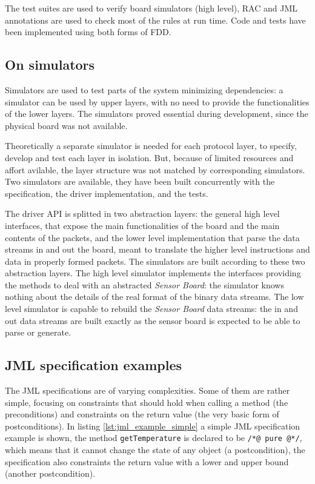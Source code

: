 \documentclass{article}
\newcommand{\lil}[1]{\texttt{\lstinline|#1|}}
\newcommand{\SB}{\emph{Sensor Board}\xspace}
\begin{document}
The test suites are used to verify board simulators (high level), RAC and JML annotations are used to check most of the rules at run time.
Code and tests have been implemented using both forms of FDD.



\subsection{On simulators}
\label{subsec:on_simulators}

Simulators are used to test parts of the system minimizing dependencies: a simulator can be used by upper layers, with no need to provide the functionalities of the lower layers. 
The simulators proved essential during development, since the physical board was not available.

Theoretically a separate simulator is needed for each protocol layer, to specify, develop and test each layer in isolation.  
But, because of limited resources and affort avilable, the layer structure was not matched by corresponding simulators.
Two simulators are available, they have been built concurrently with the specification, the driver implementation, and the tests.

The driver API is splitted in two abstraction layers: the general high level interfaces, that expose the main functionalities of the board and the main contents of the packets, and the lower level implementation that parse the data streams in and out the board, meant to translate the higher level instructions and data in properly formed packets.
The simulators are built according to these two abstraction layers.
The high level simulator implements the interfaces providing the methods to deal with an abstracted \SB: the simulator knows nothing
about the details of the real format of the binary data streams.
The low level simulator is capable to rebuild the \SB data streams: the in and out data streams are built exactly as the sensor board is expected to be able to parse or generate.



\subsection{JML specification examples}
\label{subsec:a_jml_specification_example}

The JML specifications are of varying complexities.  
Some of them are rather simple, focusing on constraints that should hold when calling a method (the preconditions) and constraints on the return value (the very basic form of postconditions). 
In listing \ref{lst:jml_example_simple} a simple JML specification example is shown, the method \lil{getTemperature} is declared to be \lil{/*@ pure @*/}, which means that it cannot change the state of any object (a postcondition), the specification also constraints the return value with a lower and upper bound (another postcondition).
\end{document}
